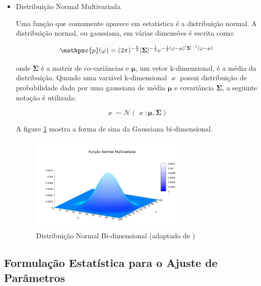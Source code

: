 {\begin{itemize}
\item Distribuição Normal Multivariada

Uma função que comumente aparece em estatística é a distribuição normal. A distribuição normal, ou gaussiana, em várias dimensões é escrita como:

\begin{equation}
\mathpzc{p}(\mathbf{\varphi}) = (2\pi)^{-\frac{k}{2}} | \mathbf{\Sigma} | ^ {-\frac{1}{2}} e^{-\frac{1}{2}(\mathbf{\varphi} - \mathbf{\mu})'\mathbf{\Sigma}^{-1}(\mathbf{\varphi} - \mathbf{\mu})}
\end{equation}

onde $\mathbf{\Sigma}$ é a matriz de co-variâncias e $\mathbf{\mu}$, um vetor k-dimensional, é a média da distribuição. Quando uma variável k-dimensional $\mathbf{\varkappa}$ possui distribuição de probabilidade dada por uma gaussiana de média $\mathbf{\mu}$ e covariância $\mathbf{\Sigma}$, a seguinte notação é utilizada:

\begin{equation}
\mathbf{\varkappa} \sim \mathcal{N}(\mathbf{\varkappa}; \mathbf{\mu}, \mathbf{\Sigma})
\end{equation}

A figure \ref{fig:normal} mostra a forma de sina da Gaussiana bi-dimensional.

\begin{figure}[!htbp]
\centering
\includegraphics[width=0.7\textwidth]{figs/multivariate.png}
\caption{Distribuição Normal Bi-dimensional (adaptado de \cite{wikipedia-on-multivariate-normal})}
\label{fig:normal}
\end{figure}

\end{itemize}

\subsection{Formulação Estatística para o Ajuste de Parâmetros}
\label{ssec:tracking-parameter-fitting}

}
